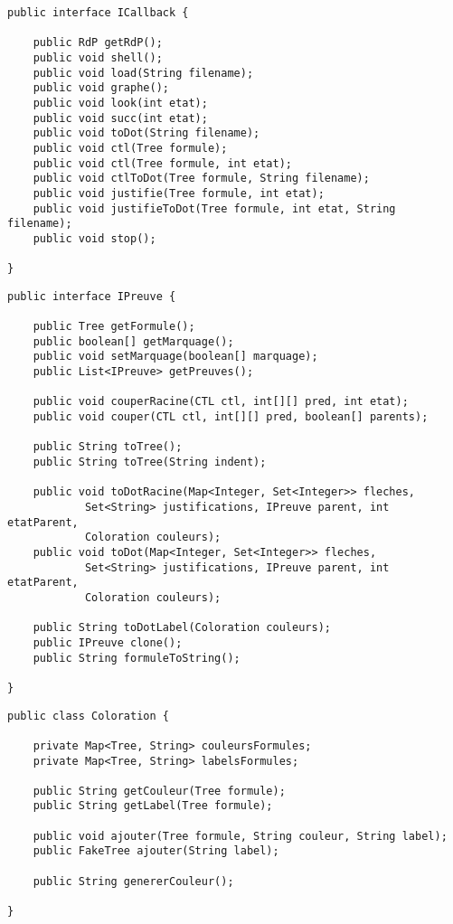 \documentclass[dvipsnames]{report}
\begin{document}
\newpage

\begin{lstlisting}[caption={Interface \psverb+ICallback+}, label={lst:ICallback}]
public interface ICallback {

	public RdP getRdP();	
	public void shell();
	public void load(String filename);
	public void graphe();
	public void look(int etat);
	public void succ(int etat);
	public void toDot(String filename);
	public void ctl(Tree formule);
	public void ctl(Tree formule, int etat);
	public void ctlToDot(Tree formule, String filename);
	public void justifie(Tree formule, int etat);
	public void justifieToDot(Tree formule, int etat, String filename);
	public void stop();

}
\end{lstlisting}

\begin{lstlisting}[caption={Interface \psverb+IPreuve+ commune à toutes les preuves}, label={lst:IPreuve}]
public interface IPreuve {

	public Tree getFormule();
	public boolean[] getMarquage();
	public void setMarquage(boolean[] marquage);
	public List<IPreuve> getPreuves();

	public void couperRacine(CTL ctl, int[][] pred, int etat);
	public void couper(CTL ctl, int[][] pred, boolean[] parents);

	public String toTree();
	public String toTree(String indent);

	public void toDotRacine(Map<Integer, Set<Integer>> fleches,
			Set<String> justifications, IPreuve parent, int etatParent,
			Coloration couleurs);
	public void toDot(Map<Integer, Set<Integer>> fleches,
			Set<String> justifications, IPreuve parent, int etatParent,
			Coloration couleurs);

	public String toDotLabel(Coloration couleurs);
	public IPreuve clone();
	public String formuleToString();

}
\end{lstlisting}

\begin{lstlisting}[caption={Classe \psverb+Coloration+}, label={lst:Coloration}]
public class Coloration {

	private Map<Tree, String> couleursFormules;
	private Map<Tree, String> labelsFormules;

	public String getCouleur(Tree formule);
	public String getLabel(Tree formule);

	public void ajouter(Tree formule, String couleur, String label);
	public FakeTree ajouter(String label);

	public String genererCouleur();

}
\end{lstlisting}
\end{document}
